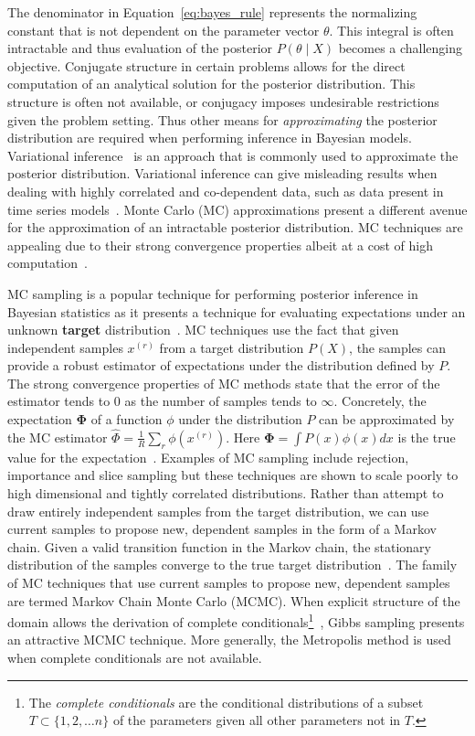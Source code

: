 The denominator in Equation~\ref{eq:bayes_rule} represents the normalizing constant that is not dependent on the parameter vector $\theta$. This integral is often intractable and thus evaluation of the posterior $P(\theta \mid X)$ becomes a challenging objective. Conjugate structure in certain problems allows for the direct computation of an analytical solution for the posterior distribution. This structure is often not available, or conjugacy imposes undesirable restrictions given the problem setting. Thus other means for \textit{approximating} the posterior distribution are required when performing inference in Bayesian models. Variational inference~\citep{attias2000variational,saul1996exploiting,saul1996mean,blei2003latent} is an approach that is commonly used to approximate the posterior distribution. Variational inference can give misleading results when dealing with highly correlated and co-dependent data, such as data present in time series models~\citep{turner2011two}. Monte Carlo (MC) approximations present a different avenue for the approximation of an intractable posterior distribution. MC techniques are appealing due to their strong convergence properties albeit at a cost of high computation~\citep{mackay1998introduction}.

MC sampling is a popular technique for performing posterior inference in Bayesian statistics as it presents a technique for evaluating expectations under an unknown \textbf{target} distribution~\citep{mackay1998introduction}. MC techniques use the fact that given independent samples $x^{(r)}$ from a target distribution $P(X)$, the samples can provide a robust estimator of expectations under the distribution defined by $P$. The strong convergence properties of MC methods state that the error of the estimator tends to $0$ as the number of samples tends to $\infty$. Concretely, the expectation $\mathbf{\Phi}$ of a function $\phi$ under the distribution $P$ can be approximated by the MC estimator $\hat{\Phi} = \frac{1}{R}\sum\limits_r \phi(x^{(r)})$. Here $\mathbf{\Phi} = \int P(x)\phi(x) dx$ is the true value for the expectation~\citep{mackay1998introduction}. Examples of MC sampling include rejection, importance and slice sampling but these techniques are shown to scale poorly to high dimensional and tightly correlated distributions. Rather than attempt to draw entirely independent samples from the target distribution, we can use current samples to propose new, dependent samples in the form of a Markov chain. Given a valid transition function in the Markov chain, the stationary distribution of the samples converge to the true target distribution~\citep{mackay1998introduction}. The family of MC techniques that use current samples to propose new, dependent samples are termed Markov Chain Monte Carlo (MCMC). When explicit structure of the domain allows the derivation of complete conditionals\footnote{The \textit{complete conditionals} are the conditional distributions of a subset $T \subset \{ 1, 2, \hdots n \}$ of the parameters given all other parameters not in $T$.}~\citep{mackay1998introduction}, Gibbs sampling presents an attractive MCMC technique. More generally, the Metropolis method is used when complete conditionals are not available.

